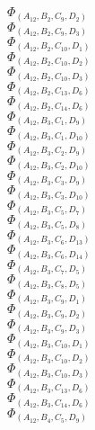 \documentclass[14pt]{article}
\begin{document}
    $\Phi_{({A}_{12}, {B}_{2}, {C}_{9}, {D}_{2})}$ \\ 
    $\Phi_{({A}_{12}, {B}_{2}, {C}_{9}, {D}_{3})}$ \\ 
    $\Phi_{({A}_{12}, {B}_{2}, {C}_{10}, {D}_{1})}$ \\ 
    $\Phi_{({A}_{12}, {B}_{2}, {C}_{10}, {D}_{2})}$ \\ 
    $\Phi_{({A}_{12}, {B}_{2}, {C}_{10}, {D}_{3})}$ \\ 
    $\Phi_{({A}_{12}, {B}_{2}, {C}_{13}, {D}_{6})}$ \\ 
    $\Phi_{({A}_{12}, {B}_{2}, {C}_{14}, {D}_{6})}$ \\ 
    $\Phi_{({A}_{12}, {B}_{3}, {C}_{1}, {D}_{9})}$ \\ 
    $\Phi_{({A}_{12}, {B}_{3}, {C}_{1}, {D}_{10})}$ \\ 
    $\Phi_{({A}_{12}, {B}_{3}, {C}_{2}, {D}_{9})}$ \\ 
    $\Phi_{({A}_{12}, {B}_{3}, {C}_{2}, {D}_{10})}$ \\ 
    $\Phi_{({A}_{12}, {B}_{3}, {C}_{3}, {D}_{9})}$ \\ 
    $\Phi_{({A}_{12}, {B}_{3}, {C}_{3}, {D}_{10})}$ \\ 
    $\Phi_{({A}_{12}, {B}_{3}, {C}_{5}, {D}_{7})}$ \\ 
    $\Phi_{({A}_{12}, {B}_{3}, {C}_{5}, {D}_{8})}$ \\ 
    $\Phi_{({A}_{12}, {B}_{3}, {C}_{6}, {D}_{13})}$ \\ 
    $\Phi_{({A}_{12}, {B}_{3}, {C}_{6}, {D}_{14})}$ \\ 
    $\Phi_{({A}_{12}, {B}_{3}, {C}_{7}, {D}_{5})}$ \\ 
    $\Phi_{({A}_{12}, {B}_{3}, {C}_{8}, {D}_{5})}$ \\ 
    $\Phi_{({A}_{12}, {B}_{3}, {C}_{9}, {D}_{1})}$ \\ 
    $\Phi_{({A}_{12}, {B}_{3}, {C}_{9}, {D}_{2})}$ \\ 
    $\Phi_{({A}_{12}, {B}_{3}, {C}_{9}, {D}_{3})}$ \\ 
    $\Phi_{({A}_{12}, {B}_{3}, {C}_{10}, {D}_{1})}$ \\ 
    $\Phi_{({A}_{12}, {B}_{3}, {C}_{10}, {D}_{2})}$ \\ 
    $\Phi_{({A}_{12}, {B}_{3}, {C}_{10}, {D}_{3})}$ \\ 
    $\Phi_{({A}_{12}, {B}_{3}, {C}_{13}, {D}_{6})}$ \\ 
    $\Phi_{({A}_{12}, {B}_{3}, {C}_{14}, {D}_{6})}$ \\ 
    $\Phi_{({A}_{12}, {B}_{4}, {C}_{5}, {D}_{9})}$ \\ 
\end{document}
